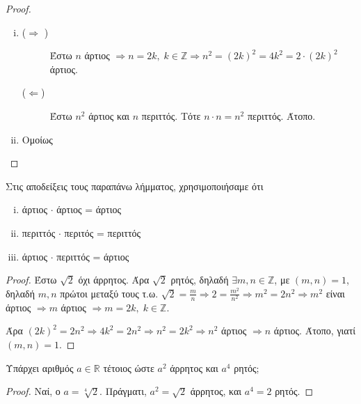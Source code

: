 \documentclass[main.tex]{subfiles}
\begin{document}
\begin{proof}
\item {}
  \begin{enumerate}[i)]
    \item 
      \begin{description}
        \item [($ \Rightarrow $ )] 
          Έστω $ n $ άρτιος $ \Rightarrow n =2k, \; k \in \mathbb{Z} 
          \Rightarrow n^{2} = (2k)^{2} = 4k^{2} = 2\cdot (2k)^{2} $ άρτιος. 
        \item [($ \Leftarrow $)] Έστω $ n^{2} $ άρτιος και $n$ περιττός. Τότε 
          $ n \cdot n = n^{2} $ περιττός. Άτοπο.
      \end{description}

    \item Ομοίως
  \end{enumerate}
\end{proof}

\begin{rem}
  Στις αποδείξεις τους παραπάνω λήμματος, χρησιμοποιήσαμε ότι 
  \begin{enumerate}[i)]
    \item άρτιος $ \cdot $ άρτιος = άρτιος
    \item περιττός $ \cdot $ περιτός = περιττός
    \item άρτιος $ \cdot $ περιττός = άρτιος
  \end{enumerate}
\end{rem}


\begin{proof}
  Έστω $ \sqrt{2} $ όχι άρρητος. Άρα $ \sqrt{2} $ ρητός, δηλαδή $ \exists m,n 
  \in \mathbb{Z} $, με $ (m,n)=1 $, δηλαδή $ m,n $ πρώτοι μεταξύ τους
  τ.ω. $ \sqrt{2} = \frac{m}{n} \Rightarrow 2 = \frac{m^{2}}{n^{2}} \Rightarrow 
  m^{2} = 2n^{2} \Rightarrow m^{2}$ είναι άρτιος $ \Rightarrow m $ άρτιος 
  $ \Rightarrow m = 2k, \; k \in \mathbb{Z}$. 

  Άρα $ (2k)^{2} = 2n^{2} \Rightarrow 4k^{2}=2n^{2} \Rightarrow n^{2} = 2k^{2} 
  \Rightarrow n^{2} $ άρτιος $ \Rightarrow n $ άρτιος. Άτοπο, γιατί $ (m,n)=1 $.
\end{proof}

\begin{example}
  Υπάρχει αριθμός $ a \in \mathbb{R} $ τέτοιος ώστε $ a^{2} $ άρρητος και $ a^{4} $ 
  ρητός; 
\end{example}

\begin{proof}
  Ναί, ο $ a= \sqrt[4]{2} $. Πράγματι, $ a^{2} = \sqrt{2} $ άρρητος, και $ 
  a^{4} = 2$ ρητός.
\end{proof}
\end{document}
